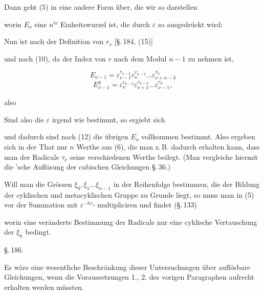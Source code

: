 
Dann geht (5) in eine andere Form über, die wir so darstellen


worin $E_\nu$ eine $n^{\mathrm{te}}$ Einheitswurzel ist, die durch $\varepsilon$ so ausgedrückt wird:


Nun ist nach der Definition von $r_\nu$ [\S.\,184, (15)]


und nach (10), da der Index von $r$ nach dem Modul $n-1$ zu nehmen ist,

\[
E_{\nu-1} = \varepsilon_{\nu-1}^{r_{n-2}} \varepsilon_\nu^{r_{n-3}} \ldots \varepsilon_{\nu+n-3}^{r_0}
\]
\[
E_{\nu-1}^g = \varepsilon_\nu^{r_{n-2}} \varepsilon_{\nu+1}^{r_{n-3}} \ldots \varepsilon_{\nu-1}^{r_0},
\]

also


Sind also die $\varepsilon$ irgend wie bestimmt, so ergiebt sich


und dadurch sind nach (12) die übrigen $E_\nu$ vollkommen bestimmt. Also ergeben sich in der That nur $n$ Werthe aus (6), die man z.\,B. dadurch erhalten kann, dass man  der Radicale $\tau_\nu$ seine verschiedenen Werthe beilegt. (Man vergleiche hiermit die 'sche Auflösung der cubischen Gleichungen \S.\,36.)

Will man die Grössen $\xi_0, \xi_1 \ldots \xi_{n-1}$ in der Reihenfolge bestimmen, die der Bildung der cyklischen und metacyklischen Gruppe zu Grunde liegt, so muss man in (5) vor der Summation mit $\varepsilon^{-h r_\nu}$ multipliciren und findet (\S.\,133)


worin eine veränderte Bestimmung der Radicale nur eine cyklische Vertauschung der $\xi_h$ bedingt.

\begin{center}
\S.\,186.

\end{center}

Es wäre eine wesentliche Beschränkung dieser Untersuchungen über auflösbare Gleichungen, wenn die Voraussetzungen 1., 2. des vorigen Paragraphen aufrecht erhalten werden müssten.
